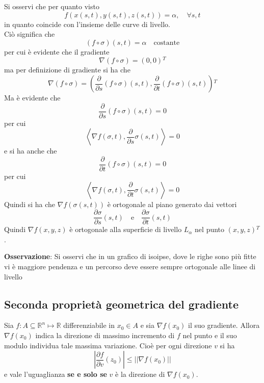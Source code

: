 \documentclass[a4paper]{extarticle}
\begin{document}
Si osservi che per quanto visto
\[f\left(x(s,t),y(s,t),z(s,t)\right)=\alpha, \hspace{1em} \forall s, t\]
in quanto coincide con l'insieme delle curve di livello.\\
Ciò significa che
\[(f \circ \sigma)(s,t) = \alpha \hspace{1em} \text{costante}\]
per cui è evidente che il gradiente
\[\nabla(f \circ \sigma) = (0,0){^T}\]
ma per definizione di gradiente si ha che
\[\nabla(f \circ \sigma) = \left(\frac{\partial}{\partial s}(f \circ \sigma)(s,t), \frac{\partial }{\partial t}(f \circ \sigma)(s,t)\right){^T}\]
Ma è evidente che
\[\frac{\partial}{\partial s}(f \circ \sigma)(s,t) = 0\]
per cui
\[\left<\nabla f(\sigma,t), \frac{\partial}{\partial s} \sigma(s,t)\right> = 0\]
e si ha anche che
\[\frac{\partial}{\partial t}(f \circ \sigma)(s,t) = 0\]
per cui
\[\left<\nabla f(\sigma,t), \frac{\partial}{\partial t} \sigma(s,t)\right> = 0\]
Quindi si ha che $\nabla f(\sigma(s,t))$ è ortogonale al piano generato dai vettori
\[\frac{\partial \sigma}{\partial s}(s,t) \hspace{1em} \text{e} \hspace{1em} \frac{\partial \sigma}{\partial t} (s,t)\]
Quindi $\nabla f(x,y,z)$ è ortogonale alla superficie di livello $L_\alpha$ nel punto $(x,y,z){^T}$.

\vspace{2em}
\noindent
\textbf{Osservazione}: Si osservi che in un grafico di isoipse, dove le righe sono più fitte vi è maggiore pendenza e un percorso deve essere sempre ortogonale alle linee di livello

\vspace{1em}
\noindent
\subsection{Seconda proprietà geometrica del gradiente}
Sia $f : A \subseteq \mathbb{R}^n \longmapsto \mathbb{R}$ differenziabile in $x_0 \in A$ e sia $\nabla f(x_0)$ il suo gradiente. Allora $\nabla f(x_0)$ indica la direzione di massimo incremento di $f$ nel punto e il suo modulo individua tale massima variazione. Cioè per ogni direzione $v$ si ha
\[\left \vert \frac{\partial f}{\partial v}(z_0) \right \vert \leq \left \vert \left \vert \nabla f(x_0) \right \vert \right \vert\]
e vale l'uguaglianza \textbf{se e solo se} $v$ è la direzione di $\nabla f(x_0)$.
\end{document}
